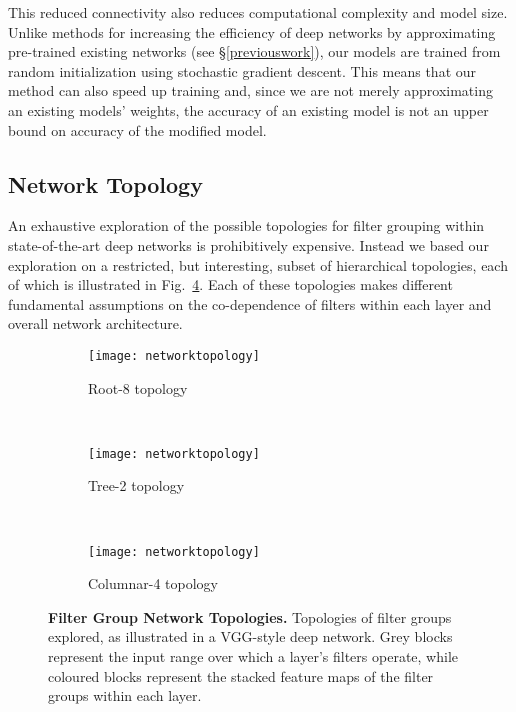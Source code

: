 \documentclass[thesis]{subfiles}
\begin{document}
	This reduced connectivity also reduces computational complexity and model size. Unlike methods for increasing the efficiency of deep networks by approximating pre-trained existing networks (see \S\ref{previouswork}), our models are trained from random initialization using stochastic gradient descent. This means that our method can also speed up training and, since we are not merely approximating an existing models' weights, the accuracy of an existing model is not an upper bound on accuracy of the modified model.
	
	\subsection{Network Topology}
	An exhaustive exploration of the possible topologies for filter grouping within state-of-the-art deep networks is prohibitively expensive. Instead we based our exploration on a restricted, but interesting, subset of hierarchical topologies, each of which is illustrated in Fig.~\ref{fig:networktopology}. 
	Each of these topologies makes different fundamental assumptions on the co-dependence of filters within each layer and overall network architecture.
	
	\begin{figure}[t]
		\centering
		\begin{subfigure}[b]{0.85\columnwidth}
			\texttt{[image: networktopology]}
			\caption{Root-8 topology}
			\label{fig:roottopology}
		\end{subfigure}
		~
		\begin{subfigure}[b]{0.85\columnwidth}
			\texttt{[image: networktopology]}
			\caption{Tree-2 topology}
			\label{fig:treetopology}
		\end{subfigure}
		~
		\begin{subfigure}[b]{0.85\columnwidth}
			\texttt{[image: networktopology]}
			\caption{Columnar-4 topology}
			\label{fig:columntopology}
		\end{subfigure}
		\caption{\textbf{Filter Group Network Topologies.} Topologies of filter groups explored, as illustrated in a VGG-style deep network. Grey blocks represent the input range over which a layer's filters operate, while coloured blocks represent the stacked feature maps of the filter groups within each layer. 
		}
		\label{fig:networktopology}
	\end{figure}
	
\end{document}
